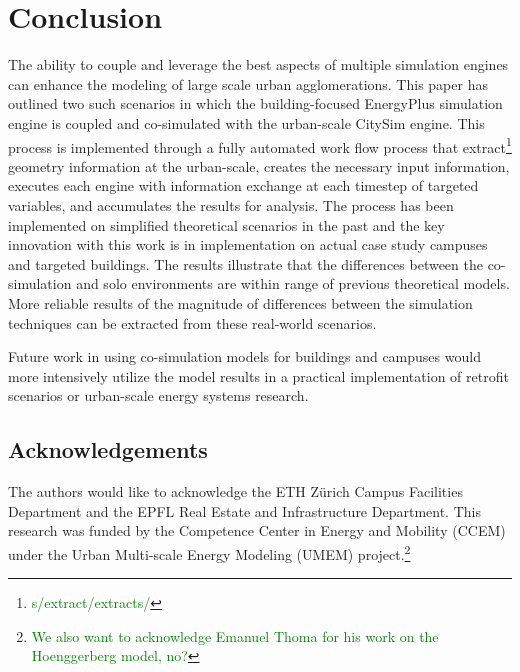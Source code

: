 \documentclass{tBPS2e}
\theoremstyle{plain}
\theoremstyle{definition}
\theoremstyle{remark}
\newcommand{\noteDT}[1]{\footnote{\textcolor{green}{#1}}}
\begin{document}
\section{Conclusion}
The ability to couple and leverage the best aspects of multiple simulation engines can enhance the modeling of large scale urban agglomerations. This paper has outlined two such scenarios in which the building-focused EnergyPlus simulation engine is coupled and co-simulated with the urban-scale CitySim engine. This process is implemented through a fully automated work flow process that extract\noteDT{s/extract/extracts/} geometry information at the urban-scale, creates the necessary input information, executes each engine with information exchange at each timestep of targeted variables, and accumulates the results for analysis. The process has been implemented on simplified theoretical scenarios in the past and the key innovation with this work is in implementation on actual case study campuses and targeted buildings. The results illustrate that the differences between the co-simulation and solo environments are within range of previous theoretical models. More reliable results of the magnitude of differences between the simulation techniques can be extracted from these real-world scenarios.

Future work in using co-simulation models for buildings and campuses would more intensively utilize the model results in a practical implementation of retrofit scenarios or urban-scale energy systems research. 

\subsection{Acknowledgements}

The authors would like to acknowledge the ETH Z\"urich Campus Facilities Department and the EPFL Real Estate and Infrastructure Department. This research was funded by the Competence Center in Energy and Mobility (CCEM) under the Urban Multi-scale Energy Modeling (UMEM) project.\noteDT{We also want to acknowledge Emanuel Thoma for his work on the Hoenggerberg model, no?}



\end{document}
